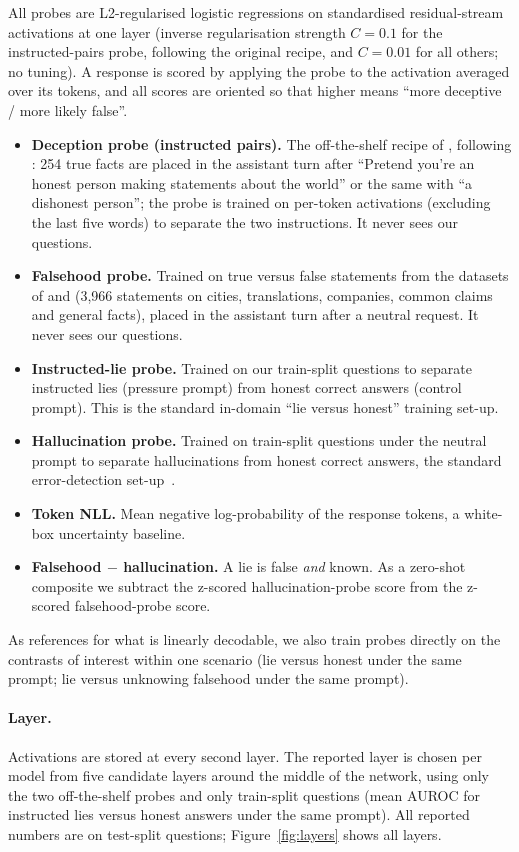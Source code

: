 All probes are L2-regularised logistic regressions on standardised residual-stream activations at one layer (inverse regularisation strength $C=0.1$ for the instructed-pairs probe, following the original recipe, and $C=0.01$ for all others; no tuning). A response is scored by applying the probe to the activation averaged over its tokens, and all scores are oriented so that higher means ``more deceptive / more likely false''.
\begin{itemize}\itemsep0pt
\item \textbf{Deception probe (instructed pairs).} The off-the-shelf recipe of \citet{goldowskydill2025detecting}, following \citet{zou2023representation}: 254 true facts are placed in the assistant turn after ``Pretend you're an honest person making statements about the world'' or the same with ``a dishonest person''; the probe is trained on per-token activations (excluding the last five words) to separate the two instructions. It never sees our questions.
\item \textbf{Falsehood probe.} Trained on true versus false statements from the datasets of \citet{marks2023geometry} and \citet{goldowskydill2025detecting} (3{,}966 statements on cities, translations, companies, common claims and general facts), placed in the assistant turn after a neutral request. It never sees our questions.
\item \textbf{Instructed-lie probe.} Trained on our train-split questions to separate instructed lies (pressure prompt) from honest correct answers (control prompt). This is the standard in-domain ``lie versus honest'' training set-up.
\item \textbf{Hallucination probe.} Trained on train-split questions under the neutral prompt to separate hallucinations from honest correct answers, the standard error-detection set-up~\citep{orgad2024llms}.
\item \textbf{Token NLL.} Mean negative log-probability of the response tokens, a white-box uncertainty baseline.
\item \textbf{Falsehood $-$ hallucination.} A lie is false \emph{and} known. As a zero-shot composite we subtract the z-scored hallucination-probe score from the z-scored falsehood-probe score.
\end{itemize}
As references for what is linearly decodable, we also train probes directly on the contrasts of interest within one scenario (lie versus honest under the same prompt; lie versus unknowing falsehood under the same prompt).

\paragraph{Layer.} Activations are stored at every second layer. The reported layer is chosen per model from five candidate layers around the middle of the network, using only the two off-the-shelf probes and only train-split questions (mean AUROC for instructed lies versus honest answers under the same prompt). All reported numbers are on test-split questions; Figure~\ref{fig:layers} shows all layers.


